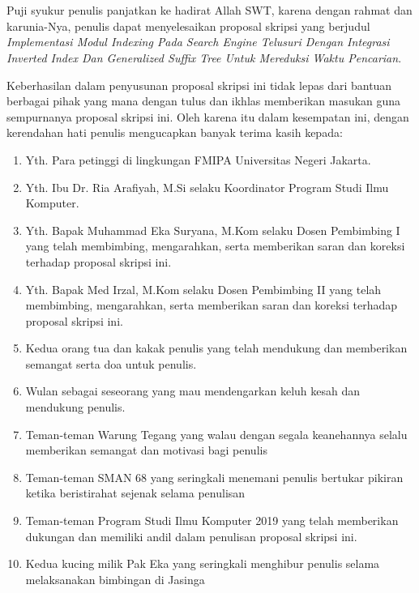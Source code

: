 \chapter*{}
\onehalfspacing{}
Puji syukur penulis panjatkan ke hadirat Allah SWT, karena dengan rahmat dan
karunia-Nya, penulis dapat menyelesaikan proposal skripsi yang berjudul
\textit{Implementasi Modul Indexing Pada Search Engine Telusuri Dengan Integrasi 
Inverted Index Dan Generalized Suffix Tree Untuk Mereduksi Waktu Pencarian}.

Keberhasilan dalam penyusunan proposal skripsi ini tidak lepas dari bantuan
berbagai pihak yang mana dengan tulus dan ikhlas memberikan masukan guna
sempurnanya proposal skripsi ini. Oleh karena itu dalam kesempatan ini, dengan
kerendahan hati penulis mengucapkan banyak terima kasih kepada:

\begin{enumerate}

	\item{Yth. Para petinggi di lingkungan FMIPA Universitas Negeri Jakarta.}
	\item{Yth. Ibu Dr. Ria Arafiyah, M.Si selaku Koordinator Program Studi Ilmu
		Komputer.}
	\item{Yth. Bapak Muhammad Eka Suryana, M.Kom selaku Dosen Pembimbing I yang
		telah membimbing, mengarahkan, serta memberikan saran dan koreksi terhadap
		proposal skripsi ini.}
	\item{Yth. Bapak Med Irzal, M.Kom selaku Dosen Pembimbing II yang telah
		membimbing, mengarahkan, serta memberikan saran dan koreksi terhadap
		proposal skripsi ini.}
	\item{Kedua orang tua dan kakak penulis yang telah mendukung dan memberikan 
		semangat serta doa untuk penulis.}
	\item{Wulan sebagai seseorang yang mau mendengarkan keluh kesah dan mendukung 
		penulis.}
	\item{Teman-teman Warung Tegang yang walau dengan segala keanehannya selalu
		memberikan semangat dan motivasi bagi penulis}
	\item{Teman-teman SMAN 68 yang seringkali menemani penulis bertukar pikiran 
		ketika beristirahat sejenak selama penulisan}
	\item{Teman-teman Program Studi Ilmu Komputer 2019 yang telah memberikan 
		dukungan dan memiliki andil dalam penulisan proposal skripsi ini.}
	\item{Kedua kucing milik Pak Eka yang seringkali menghibur penulis selama 
		melaksanakan bimbingan di Jasinga}
	
\end{enumerate}

